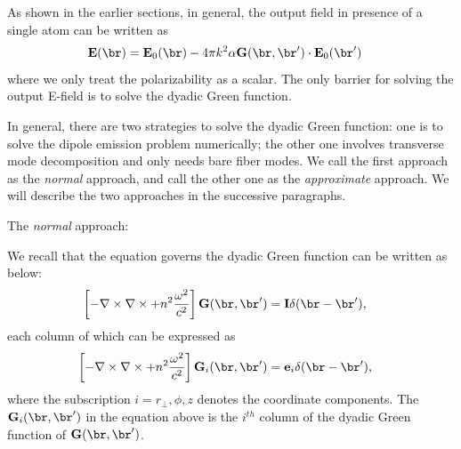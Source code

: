 \documentclass[]{report}
\begin{document}
As shown in the earlier sections, in general, the output field in presence of a single atom can be written as
\begin{align}
\mathbf{E}(\br) 
&=\mathbf{E}_0(\br)-4\pi k^2\alpha \mathbf{G}(\br,\br')\cdot \mathbf{E}_0(\br')
\end{align}
where we only treat the polarizability as a scalar. The only barrier for solving the output E-field is to solve the dyadic Green function.

In general, there are two strategies to solve the dyadic Green function: one is to solve the dipole emission problem numerically; the other one involves transverse mode decomposition and only needs bare fiber modes. We call the first approach as the \textit{normal} approach, and call the other one as the \textit{approximate} approach. We will describe the two approaches in the successive paragraphs. 

The \textit{normal} approach:

We recall that the equation governs the dyadic Green function can be written as below:
\begin{align}
\left[ -\nabla\times\nabla\times + n^2\frac{\omega^2}{c^2} \right] \mathbf{G}(\br,\br') &= \mathbf{I}\delta(\br-\br'),
\end{align}
each column of which can be expressed as
\begin{align}
\left[ -\nabla\times\nabla\times + n^2\frac{\omega^2}{c^2} \right] \mathbf{G}_i(\br,\br') &= \mathbf{e}_i\delta(\br-\br'), \label{eq:Gi}
\end{align}
where the subscription $ i=r\!_\perp,\phi,z $ denotes the coordinate components. The $ \mathbf{G}_i(\br,\br') $ in the equation above is the $ i^{th} $ column of the dyadic Green function of $ \mathbf{G}(\br,\br') $.  
\end{document}
